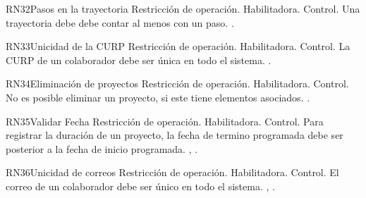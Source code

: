 \begin{BussinesRule}{RN32}{Pasos en la trayectoria} 
	\BRitem[Tipo:] Restricción de operación. 
	\BRitem[Clase:] Habilitadora. 
	\BRitem[Nivel:] Control. %
	\BRitem[Descripción:] Una trayectoria debe debe contar al menos con un paso.
	 \UCref{}{}. 
\end{BussinesRule}

\begin{BussinesRule}{RN33}{Unicidad de la CURP} 
	\BRitem[Tipo:] Restricción de operación. 
	\BRitem[Clase:] Habilitadora. 
	\BRitem[Nivel:] Control. %
	\BRitem[Descripción:] La CURP de un colaborador debe ser única en todo el sistema.
	 . 
\end{BussinesRule}


\begin{BussinesRule}{RN34}{Eliminación de proyectos} 
	\BRitem[Tipo:] Restricción de operación. 
	\BRitem[Clase:] Habilitadora. 
	\BRitem[Nivel:] Control. %
	\BRitem[Descripción:] No es posible eliminar un proyecto, si este tiene elementos asociados.
	 . 
\end{BussinesRule}


\begin{BussinesRule}{RN35}{Validar Fecha} 
	\BRitem[Tipo:] Restricción de operación. 
	\BRitem[Clase:] Habilitadora. 
	\BRitem[Nivel:] Control. %
	\BRitem[Descripción:] Para registrar la duración de un proyecto, la fecha de termino programada debe ser posterior a la fecha de inicio programada.
	 , . 
\end{BussinesRule}


\begin{BussinesRule}{RN36}{Unicidad de correos} 
	\BRitem[Tipo:] Restricción de operación. 
	\BRitem[Clase:] Habilitadora. 
	\BRitem[Nivel:] Control. %
	\BRitem[Descripción:] El correo de un colaborador debe ser único en todo el sistema.
	 , . 
\end{BussinesRule}


